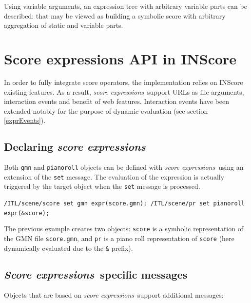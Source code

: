 \documentclass{article}
\newcommand{\OSC}[1]{\texttt{#1}}
\newcommand{\sExpr}{\emph{score expressions}}
\newcommand{\SExpr}{\emph{Score expressions}}
\newcommand{\sample}	[1]			{\vspace{-0.2em}\begin{center}\colorbox{mygrey}{\begin{minipage}[t]{0.95\columnwidth} {\small \texttt{#1}}\end{minipage}}\end{center}}
\begin{document}

Using variable arguments, an expression tree with arbitrary variable parts can be described: that may be viewed as building a symbolic score with arbitrary aggregation of static and variable parts.


\section{Score expressions API in INScore}
\label{exprAPI}
In order to fully integrate score operators, the implementation relies on INScore existing features. As a result, \sExpr\ support URLs as file arguments, interaction events and benefit of web features. Interaction events have been extended notably for the purpose of dynamic evaluation (see section \ref{exprEvents}).

\subsection{Declaring \sExpr}
\label{declaringExpr}
Both \OSC{gmn} and \OSC{pianoroll} objects can be defined with \sExpr\ using an extension of the \OSC{set} message. The evaluation of the expression is actually triggered by the target object when the \OSC{set} message is processed.

\sample{/ITL/scene/score set gmn expr(score.gmn);
/ITL/scene/pr set pianoroll expr(\&score);
}

The previous example creates two objects: \OSC{score} is a symbolic representation of the GMN file \OSC{score.gmn}, and \OSC{pr} is a piano roll representation of \OSC{score} (here dynamically evaluated due to the \OSC{\&} prefix).


\subsection{\SExpr\ specific messages}
\label{exprMsgs}
Objects that are based on \sExpr\ support additional messages:
\end{document}
